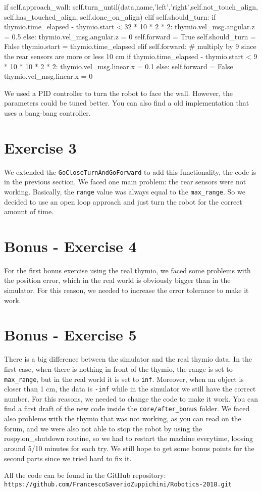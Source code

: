 \documentclass[11pt]{article}
\begin{document}
\begin{python}
        if self.approach_wall:
            self.turn_until(data,name,'left','right',self.not_touch_align, self.has_touched_align, self.done_on_align)
        elif self.should_turn:
            if thymio.time_elapsed - thymio.start <  32 * 10 * 2 * 2:
                thymio.vel_msg.angular.z = 0.5
            else: 
                thymio.vel_msg.angular.z = 0
                self.forward = True
                self.should_turn = False
                thymio.start = thymio.time_elapsed 
        elif self.forward:
            # multiply by 9 since the rear sensors are more or less 10 cm
            if thymio.time_elapsed - thymio.start <  9 * 10 *  10 * 2 * 2:
                thymio.vel_msg.linear.x = 0.1
            else: 
                self.forward = False
                thymio.vel_msg.linear.x = 0

\end{python}
We used a PID controller to turn the robot to face the wall. However, the parameters could be tuned better. You can also find a old implementation that uses a bang-bang controller.

\section{Exercise 3}
We extended the \texttt{GoCloseTurnAndGoForward} to add this functionality, the code is in the previous section. We faced one main problem: the rear sensors were not working. Basically, the \texttt{range} value was always equal to the \texttt{max\_range}. So we decided to use an open loop approach and just turn the robot for the correct amount of time.

\section{Bonus - Exercise 4}
For the first bonus exercise using the real thymio, we faced some problems with the position error, which in the real world is obviously bigger than in the simulator. For this reason, we needed to increase the error tolerance to make it work.

\section{Bonus - Exercise 5}
There is a big difference between the simulator and the real thymio data. In the first case, when there is nothing in front of the thymio, the range is set to \texttt{max\_range}, but in the real world it is set to \texttt{inf}. Moreover, when an object is closer than 1 cm, the data is \texttt{-inf} while in the simulator we still have the correct number. For this reasons, we needed to change the code to make it work. You can find a first draft of the new code inside the \texttt{core/after\_bonus} folder. We faced also problems with the thymio that was not working, as you can read on the forum, and we were also not able to stop the robot by using the rospy.on\_shutdown routine, so we had to restart the machine everytime, loosing around 5/10 minutes for each try. We still hope to get some bonus points for the second parts since we tried hard to fix it.

All the code can be found in the GitHub repository:\\
\texttt{https://github.com/FrancescoSaverioZuppichini/Robotics-2018.git}
\end{document}
